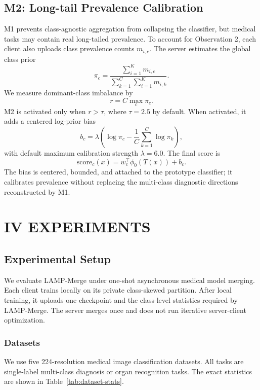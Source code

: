 \subsection{M2: Long-tail Prevalence Calibration}

M1 prevents class-agnostic aggregation from collapsing the classifier, but medical tasks may contain real long-tailed prevalence. To account for Observation 2, each client also uploads class prevalence counts $m_{i,c}$. The server estimates the global class prior
\[
\pi_c=\frac{\sum_{i=1}^{K}m_{i,c}}{\sum_{k=1}^{C}\sum_{i=1}^{K}m_{i,k}}.
\]
We measure dominant-class imbalance by
\[
r=C\max_c \pi_c.
\]
M2 is activated only when $r>\tau$, where $\tau=2.5$ by default. When activated, it adds a centered log-prior bias
\[
b_c=\lambda\left(\log\pi_c-\frac{1}{C}\sum_{k=1}^{C}\log\pi_k\right),
\]
with default maximum calibration strength $\lambda=6.0$. The final score is
\[
\mathrm{score}_c(x)=w_c^\top\phi_0(T(x))+b_c.
\]
The bias is centered, bounded, and attached to the prototype classifier; it calibrates prevalence without replacing the multi-class diagnostic directions reconstructed by M1.

\section{IV EXPERIMENTS}

\subsection{Experimental Setup}

We evaluate LAMP-Merge under one-shot asynchronous medical model merging. Each client trains locally on its private class-skewed partition. After local training, it uploads one checkpoint and the class-level statistics required by LAMP-Merge. The server merges once and does not run iterative server-client optimization.

\subsubsection{Datasets}

We use five 224-resolution medical image classification datasets. All tasks are single-label multi-class diagnosis or organ recognition tasks. The exact statistics are shown in Table~\ref{tab:dataset-stats}.

